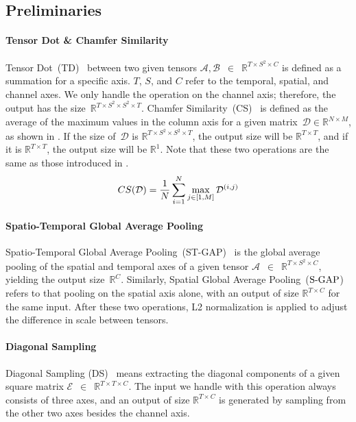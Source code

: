 \documentclass[10pt,twocolumn,letterpaper]{article}
\begin{document}
    \subsection{Preliminaries}
        \paragraph{Tensor Dot \& Chamfer Similarity \\}
            Tensor Dot~(TD)~\cite{yang2016deep} between two given tensors $\mathcal{A},\mathcal{B}$~$\in$~$\mathbb{R}^{T \times S^2 \times C}$ is defined as a summation for a specific axis. $T$, $S$, and $C$ refer to the temporal, spatial, and channel axes. We only handle the operation on the channel axis; therefore, the output has the size~$\mathbb{R}^{T \times S^2 \times S^2 \times T}$. Chamfer Similarity~(CS)~\cite{barrow1977parametric} is defined as the average of the maximum values in the column axis for a given matrix~$\mathcal{D} \in \mathbb{R}^{N \times M}$, as shown in . If the size of~$\mathcal{D}$ is $\mathbb{R}^{T \times S^2 \times S^2 \times T}$, the output size will be $\mathbb{R}^{T \times T}$, and if it is $\mathbb{R}^{T \times T}$, the output size will be $\mathbb{R}^{1}$. Note that these two operations are the same as those introduced in \cite{kordopatis2019visil}.
            \begin{equation}
                \small
                CS(\mathcal{D}) = \frac{1}{N}\sum_{i=1}^{N} \max_{j\in [1,M]} \mathcal{D}^{(i,j)}
                \label{eq1}
            \end{equation}
            \vspace{-4mm}
        \paragraph{Spatio-Temporal Global Average Pooling \\}
            Spatio-Temporal Global Average Pooling~(ST-GAP)~\cite{lin2013network} is the global average pooling of the spatial and temporal axes of a given tensor $\mathcal{A}$~$\in$~$\mathbb{R}^{T \times S^2 \times C}$, yielding the output size~$\mathbb{R}^{C}$. Similarly, Spatial Global Average Pooling~($\textup{S-GAP}$) refers to that pooling on the spatial axis alone, with an output of size $\mathbb{R}^{T \times C}$ for the same input. After these two operations, L2 normalization is applied to adjust the difference in scale between tensors.
            \vspace{-3mm}
        \paragraph{Diagonal Sampling \\}
            Diagonal Sampling (DS)~\cite{kang2022uboco} means extracting the diagonal components of a given square matrix $\mathcal{E}$~$\in$~$\mathbb{R}^{T \times T \times C}$. The input we handle with this operation always consists of three axes, and an output of size $\mathbb{R}^{T \times C}$ is generated by sampling from the other two axes besides the channel axis.
            \vspace{-0mm}
\end{document}
